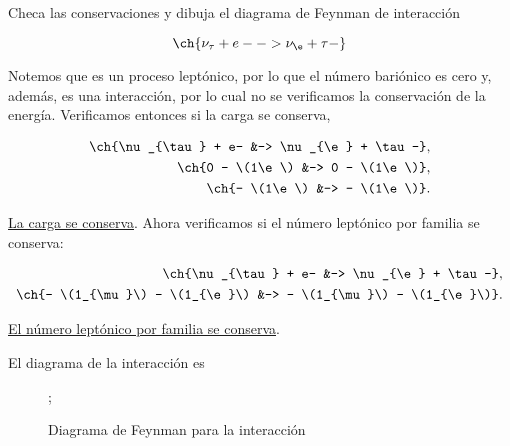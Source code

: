 \documentclass[./../main.tex]{subfiles}
\begin{document}
    \begin{exercise}
        Checa las conservaciones y dibuja el diagrama de Feynman de interacción

        \begin{equation*}
            \ch{\nu_{\tau} + e- -> \nu_{\e} + \tau-}
        \end{equation*}

        \begin{solution}
            Notemos que es un proceso leptónico, por lo que el número bariónico es cero y, además, es una interacción, por lo cual no se verificamos la conservación de la energía. Verificamos entonces si la carga se conserva,

            \begin{align*}
                \ch{\nu_{\tau} + e- &-> \nu_{\e} + \tau-},\\
                \ch{0 - \(1\e\) &-> 0 - \(1\e\)},\\
                \ch{- \(1\e\) &-> - \(1\e\)}.
            \end{align*}

            \ul{La carga se conserva}. Ahora verificamos si el número leptónico por familia se conserva:

            \begin{align*}
                \ch{\nu_{\tau} + e- &-> \nu_{\e} + \tau-},\\
                \ch{- \(1_{\mu}\) - \(1_{\e}\) &-> - \(1_{\mu}\) - \(1_{\e}\)}.
            \end{align*}

            \ul{El número leptónico por familia se conserva}.

            El diagrama de la interacción es

            \begin{figure}[htb]
                \centering
                ;
                \caption{Diagrama de Feynman para la interacción }
                \label{fig:neutrinotau-electron-interaction}
            \end{figure}
        \end{solution}
    \end{exercise}
\end{document}
